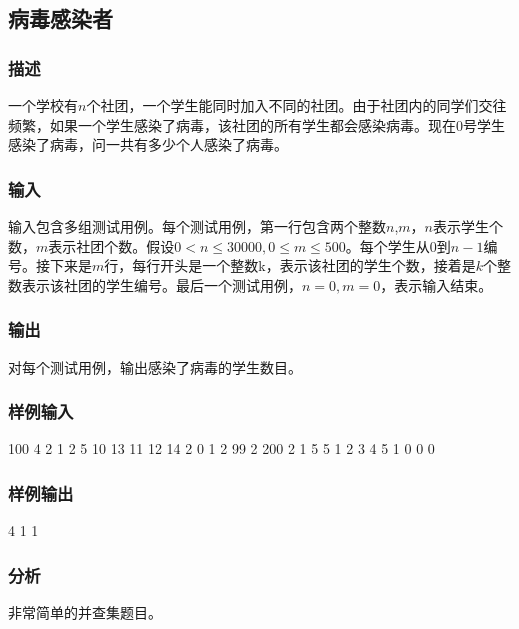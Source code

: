 \subsection{病毒感染者} %
\subsubsection{描述}
一个学校有$n$个社团，一个学生能同时加入不同的社团。由于社团内的同学们交往频繁，如果一个学生感染了病毒，该社团的所有学生都会感染病毒。现在0号学生感染了病毒，问一共有多少个人感染了病毒。

\subsubsection{输入}
输入包含多组测试用例。每个测试用例，第一行包含两个整数$n$,$m$，$n$表示学生个数，$m$表示社团个数。假设$0 < n \leq 30000, 0 \leq m \leq 500$。每个学生从0到$n-1$编号。接下来是$m$行，每行开头是一个整数k，表示该社团的学生个数，接着是$k$个整数表示该社团的学生编号。最后一个测试用例，$n=0,m=0$，表示输入结束。

\subsubsection{输出}
对每个测试用例，输出感染了病毒的学生数目。

\subsubsection{样例输入}
\begin{Code}
100 4
2 1 2
5 10 13 11 12 14
2 0 1
2 99 2
200 2
1 5
5 1 2 3 4 5
1 0
0 0
\end{Code}

\subsubsection{样例输出}
\begin{Code}
4
1
1
\end{Code}

\subsubsection{分析}
非常简单的并查集题目。

